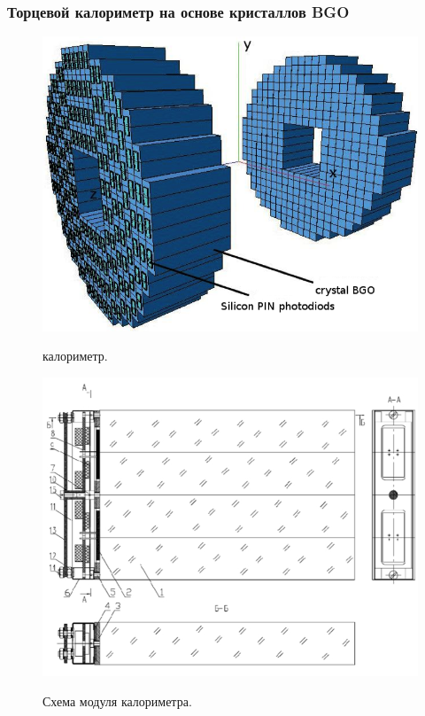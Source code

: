 
\subsubsection{Торцевой калориметр на основе кристаллов BGO}
\label{sec:bgo}

\begin{figure}[htbp]
    \begin{minipage}[t]{0.475\textwidth}
        \centering
        \includegraphics[width=\textwidth]{img/cmd3_detector/bgo_scetch.png}
        \label{fig:cal_energy_resolution}
        \caption{ калориметр.}
    \end{minipage}
    \hfill
    \begin{minipage}[t]{0.475\textwidth}
        \centering
        \includegraphics[width=\textwidth]{img/cmd3_detector/bgo_module_scheme.png}
        \label{fig:cal_spatial_resolution}
        \caption{Схема модуля  калориметра.}
  \end{minipage}
\end{figure}

